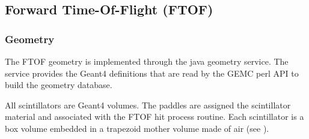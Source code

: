 \subsection{Forward Time-Of-Flight (FTOF)}

\subsubsection{Geometry}

The FTOF geometry is implemented through the java geometry service.
The service provides the Geant4 definitions that are read by the GEMC perl API to build the geometry database.

All scintillators are Geant4 volumes. The paddles are assigned the scintillator material and associated with the FTOF hit process routine.
Each scintillator is a box volume embedded in a trapezoid mother volume made of air (see ).

